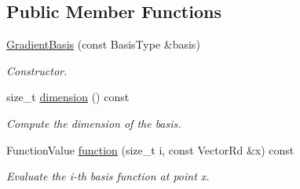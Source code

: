 \subsection*{Public Member Functions}
\begin{DoxyCompactItemize}
\item 
\mbox{\label{classHArDCore3D_1_1GradientBasis_af2fa9b4764b550f576aeba7e24e6c911}} 
\hyperlink{classHArDCore3D_1_1GradientBasis_af2fa9b4764b550f576aeba7e24e6c911}{Gradient\+Basis} (const Basis\+Type \&basis)
\begin{DoxyCompactList}\small\item\em Constructor. \end{DoxyCompactList}\item 
\mbox{\label{classHArDCore3D_1_1GradientBasis_abf5cc38208c346f4b6f6d5ca5d20d767}} 
size\+\_\+t \hyperlink{classHArDCore3D_1_1GradientBasis_abf5cc38208c346f4b6f6d5ca5d20d767}{dimension} () const
\begin{DoxyCompactList}\small\item\em Compute the dimension of the basis. \end{DoxyCompactList}\item 
\mbox{\label{classHArDCore3D_1_1GradientBasis_a21186eb9b6825da3867965bd2e046b23}} 
Function\+Value \hyperlink{classHArDCore3D_1_1GradientBasis_a21186eb9b6825da3867965bd2e046b23}{function} (size\+\_\+t i, const Vector\+Rd \&x) const
\begin{DoxyCompactList}\small\item\em Evaluate the i-\/th basis function at point x. \end{DoxyCompactList}\end{DoxyCompactItemize}
